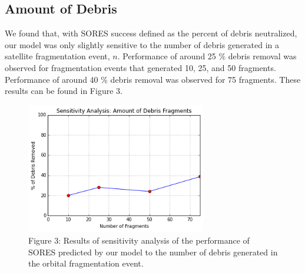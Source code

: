 \documentclass[12pt]{scrartcl}
\begin{document}
\subsection{Amount of Debris}
We found that, with SORES success defined as the percent of debris neutralized, our model was only slightly sensitive to the number of debris generated in a satellite fragmentation event, $n$. Performance of around 25 \% debris removal was observed for fragmentation events that generated 10, 25, and 50 fragments. Performance of around 40 \% debris removal was observed for 75 fragments. These results can be found in Figure 3. 
\begin{figure}
\begin{center}
\label{fig:debrisfragmentssensitivity}
\includegraphics[width=0.7\textwidth]{fragments.png}\\
Figure 3: Results of sensitivity analysis of the performance of SORES predicted by our model to the number of debris generated in the orbital fragmentation event.
\end{center}
\end{figure}
\end{document}

